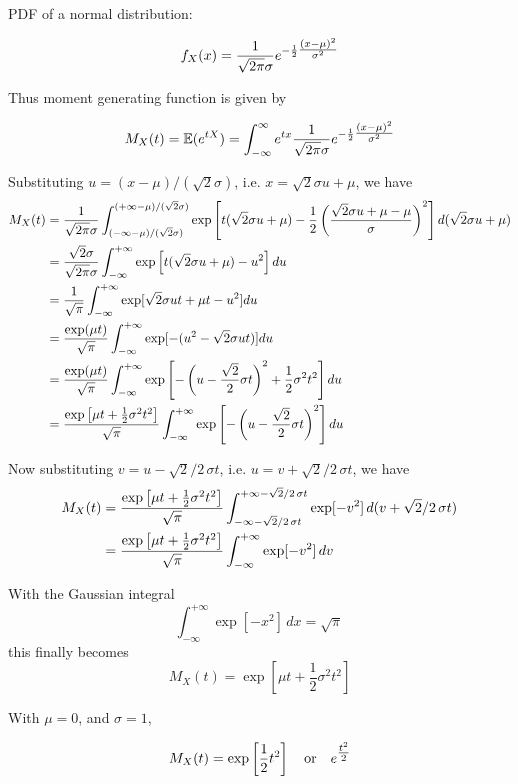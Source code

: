 \documentclass[12pt, xcolor=dvipsnames,svgnames,x11names]{article}
\makeatletter
\newenvironment{multiequation}[1][]{%
\begin{equation}%
   \begin{aligned}%
   \ifx#1\@empty\else\label{#1}\fi%
}{%
   \end{aligned}%
\end{equation}%
}
\makeatother
\begin{document}
\begin{answerbox}
PDF of a normal distribution:

\begin{multiequation}
f_X(x)  = \frac{1}{\sqrt{2\pi}\sigma} e^{-\frac{1}{2} \tfrac{(x-\mu)^2}{\sigma^2} }
\end{multiequation}

Thus moment generating function is given by

\begin{multiequation}
M_X(t) = \Ebb(e^{tX}) = \int_{-\infty}^\infty e^{tx} \frac{1}{\sqrt{2\pi}\sigma} e^{-\frac{1}{2} \tfrac{(x-\mu)^2}{\sigma^2} }
\end{multiequation}

Substituting $u = (x - \mu)/(\sqrt{2}\sigma)$, i.e. $x = \sqrt{2}\sigma u + \mu$, we have
\begin{multiequation}
    M_X(t) &= \frac{1}{\sqrt{2\pi}\sigma} \int_{(-\infty-\mu)/(\sqrt{2}\sigma)}^{(+\infty-\mu)/(\sqrt{2}\sigma)} \exp\left[ t(\sqrt{2}\sigma u + \mu) - \frac{1}{2}\left( \frac{\sqrt{2}\sigma u + \mu - \mu}{\sigma} \right)^2 \right] d(\sqrt{2}\sigma u + \mu) \\
    &= \frac{\sqrt{2}\sigma}{\sqrt{2\pi}\sigma} \int_{-\infty}^{+\infty} \exp\left[t(\sqrt{2}\sigma u + \mu) - u^2\right] du \\
    &= \frac{1}{\sqrt{\pi}} \int_{-\infty}^{+\infty} \exp[\sqrt{2}\sigma ut + \mu t - u^2] du \\
    &= \frac{\exp(\mu t)}{\sqrt{\pi}} \int_{-\infty}^{+\infty} \exp[-(u^2 - \sqrt{2}\sigma ut)] du \\
    &= \frac{\exp(\mu t)}{\sqrt{\pi}} \int_{-\infty}^{+\infty} \exp\left[ - \left( u - \frac{\sqrt{2}}{2}\sigma t \right)^2 + \frac{1}{2}\sigma^2 t^2 \right] du \\
    &= \frac{\exp\left[\mu t + \frac{1}{2}\sigma^2 t^2\right]}{\sqrt{\pi}} \int_{-\infty}^{+\infty} \exp\left[ - \left( u - \frac{\sqrt{2}}{2}\sigma t \right)^2 \right] du 
\end{multiequation}

Now substituting $v = u - \sqrt{2}/2 \, \sigma t$, i.e. $u = v + \sqrt{2}/2 \, \sigma t$, we have
\begin{multiequation}
    M_X(t) &= \frac{\exp\left[\mu t + \frac{1}{2}\sigma^2 t^2\right]}{\sqrt{\pi}} \int_{-\infty - \sqrt{2}/2 \, \sigma t}^{+\infty - \sqrt{2}/2 \, \sigma t} \exp[-v^2] \, d(v + \sqrt{2}/2 \, \sigma t) \\
    &= \frac{\exp\left[\mu t + \frac{1}{2}\sigma^2 t^2\right]}{\sqrt{\pi}} \int_{-\infty}^{+\infty} \exp[-v^2] \, dv \, 
\end{multiequation}

With the Gaussian integral
$$
    \int_{-\infty}^{+\infty} \exp[-x^2] \, dx = \sqrt{\pi} \, 
$$
this finally becomes
$$
    M_X(t) = \exp\left[\mu t + \frac{1}{2}\sigma^2 t^2\right] 
$$

With $\mu = 0$, and $\sigma = 1$, 

\begin{multiequation}
M_X(t) = \exp\left[  \frac{1}{2}t^2 \right] ~~~\text{or}~~~ e^{\tfrac{t^2}{2}}
\end{multiequation}

\end{answerbox}
\end{document}
